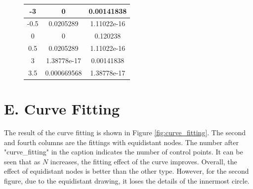 \documentclass[a4paper]{article}
\begin{document}
\begin{figure}[h]
\begin{minipage}{0.35\textwidth}
\begin{tabular}{|c|c|c|}
      -3         & 0                              & 0.00141838                       \\ \hline
      -0.5       & 0.0205289                      & 1.11022e-16                      \\ \hline
       0         & 0                              & 0.120238                         \\ \hline
       0.5       & 0.0205289                      & 1.11022e-16                      \\ \hline
       3         & 1.38778e-17                    & 0.00141838                       \\ \hline
       3.5       & 0.000669568                    & 1.38778e-17                      \\ \hline
    \end{tabular}
    \label{tab:interpolation_errors}
  \end{minipage}
\end{figure}

\newpage

\section*{E. Curve Fitting}

The result of the curve fitting is shown in Figure \ref{fig:curve_fitting}. The second and fourth columns are the fittings with equidistant nodes. The number after "curve\_fitting" in the caption indicates the number of control points. It can be seen that as $N$ increases, the fitting effect of the curve improves. Overall, the effect of equidistant nodes is better than the other type. However, for the second figure, due to the equidistant drawing, it loses the details of the innermost circle.
\end{document}
